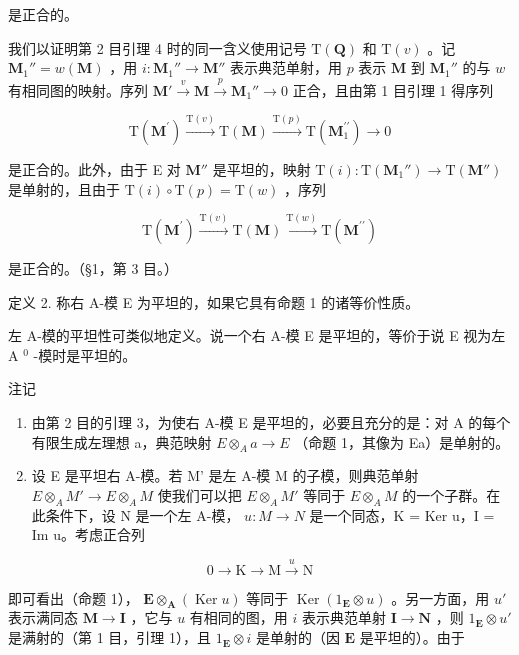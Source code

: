 是正合的。

我们以证明第 2 目引理 4 时的同一含义使用记号 \(\mathrm{T}(\mathbf{Q})\) 和 \(\mathrm{T}(v)\) 。记 \(\mathbf{M}_1'' = w(\mathbf{M})\) ，用 \(i: \mathbf{M}_1'' \to \mathbf{M}''\) 表示典范单射，用 \(p\) 表示 \(\mathbf{M}\) 到 \(\mathbf{M}_1''\) 的与 \(w\) 有相同图的映射。序列 \(\mathbf{M}' \xrightarrow{v} \mathbf{M} \xrightarrow{p} \mathbf{M}_1'' \to 0\) 正合，且由第 1 目引理 1 得序列

\[
\mathrm{T} (\mathbf {M} ^ {\prime}) \xrightarrow {\mathrm{T} (v)} \mathrm{T} (\mathbf {M}) \xrightarrow {\mathrm{T} (p)} \mathrm{T} (\mathbf {M} _ {1} ^ {\prime \prime}) \longrightarrow 0
\]

是正合的。此外，由于 E 对 \(\mathbf{M}''\) 是平坦的，映射 \(\mathrm{T}(i): \mathrm{T}(\mathbf{M}_1'') \to \mathrm{T}(\mathbf{M}'')\) 是单射的，且由于 \(\mathrm{T}(i) \circ \mathrm{T}(p) = \mathrm{T}(w)\) ，序列

\[
\mathrm{T} (\mathbf {M} ^ {\prime}) \xrightarrow {\mathrm{T} (v)} \mathrm{T} (\mathbf {M}) \xrightarrow {\mathrm{T} (w)} \mathrm{T} (\mathbf {M} ^ {\prime \prime})
\]

是正合的。（§1，第 3 目。）

定义 2. 称右 A-模 E 为平坦的，如果它具有命题 1 的诸等价性质。

左 A-模的平坦性可类似地定义。说一个右 A-模 E 是平坦的，等价于说 E 视为左 A \(^{0}\) -模时是平坦的。

注记

\begin{enumerate}
\def\labelenumi{(\arabic{enumi})}
\item
  由第 2 目的引理 3，为使右 A-模 E 是平坦的，必要且充分的是：对 A 的每个有限生成左理想 a，典范映射 \(E \otimes_{A} a \to E\) （命题 1，其像为 Ea）是单射的。
\item
  设 E 是平坦右 A-模。若 M' 是左 A-模 M 的子模，则典范单射 \(E \otimes_{A} M' \to E \otimes_{A} M\) 使我们可以把 \(E \otimes_{A} M'\) 等同于 \(E \otimes_{A} M\) 的一个子群。在此条件下，设 N 是一个左 A-模， \(u: M \to N\) 是一个同态，K = Ker u，I = Im u。考虑正合列
\end{enumerate}

\[
0 \longrightarrow \mathrm{K} \longrightarrow \mathrm{M} \stackrel {u} {\longrightarrow} \mathrm{N}
\]

即可看出（命题 1）， \(\mathbf{E} \otimes_{\mathbf{A}} (\operatorname{Ker} u)\) 等同于 \(\operatorname{Ker}(1_{\mathbf{E}} \otimes u)\) 。另一方面，用 \(u'\) 表示满同态 \(\mathbf{M} \to \mathbf{I}\) ，它与 \(u\) 有相同的图，用 \(i\) 表示典范单射 \(\mathbf{I} \to \mathbf{N}\) ，则 \(1_{\mathbf{E}} \otimes u'\) 是满射的（第 1 目，引理 1），且 \(1_{\mathbf{E}} \otimes i\) 是单射的（因 \(\mathbf{E}\) 是平坦的）。由于

